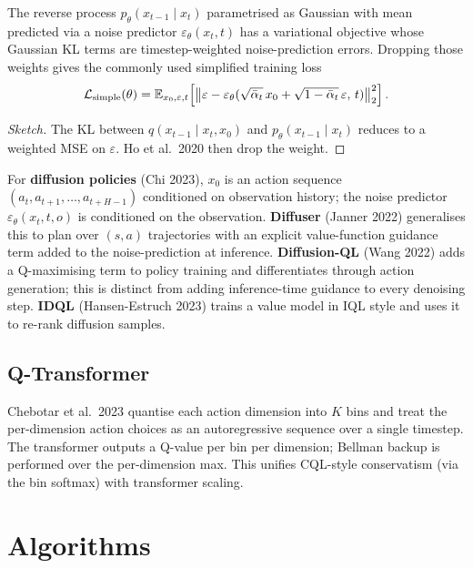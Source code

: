 \documentclass[11pt,oneside]{scrbook}
\begin{document}
\begin{theorem}
The reverse process $p_\theta(x_{t-1} \mid x_t)$ parametrised as Gaussian with mean predicted via a noise predictor $\varepsilon_\theta(x_t, t)$ has a variational objective whose Gaussian KL terms are timestep-weighted noise-prediction errors. Dropping those weights gives the commonly used simplified training loss
\[
  \mathcal{L}_{\mathrm{simple}}(\theta) = \mathbb{E}_{x_0, \varepsilon, t}\!\left[\bigl\|\varepsilon - \varepsilon_\theta(\sqrt{\bar\alpha_t}\, x_0 + \sqrt{1 - \bar\alpha_t}\, \varepsilon,\, t)\bigr\|_2^2\right].
\]
\end{theorem}

\begin{proof}[Sketch]
The KL between $q(x_{t-1} \mid x_t, x_0)$ and $p_\theta(x_{t-1} \mid x_t)$ reduces to a weighted MSE on $\varepsilon$. Ho et al.\ 2020 then drop the weight.
\end{proof}

For \textbf{diffusion policies} (Chi 2023), $x_0$ is an action sequence $(a_t, a_{t+1}, \ldots, a_{t+H-1})$ conditioned on observation history; the noise predictor $\varepsilon_\theta(x_t, t, o)$ is conditioned on the observation. \textbf{Diffuser} (Janner 2022) generalises this to plan over $(s, a)$ trajectories with an explicit value-function guidance term added to the noise-prediction at inference. \textbf{Diffusion-QL} (Wang 2022) adds a Q-maximising term to policy training and differentiates through action generation; this is distinct from adding inference-time guidance to every denoising step. \textbf{IDQL} (Hansen-Estruch 2023) trains a value model in IQL style and uses it to re-rank diffusion samples.

\section{Q-Transformer}

Chebotar et al.\ 2023 quantise each action dimension into $K$ bins and treat the per-dimension action choices as an autoregressive sequence over a single timestep. The transformer outputs a Q-value per bin per dimension; Bellman backup is performed over the per-dimension max. This unifies CQL-style conservatism (via the bin softmax) with transformer scaling.

\chapter{Algorithms}
\end{document}
